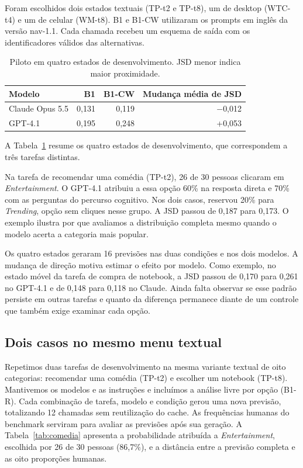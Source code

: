 \documentclass[12pt]{article}
\begin{document}
Foram escolhidos dois estados textuais (TP-t2 e TP-t8), um de desktop (WTC-t4) e um de celular (WM-t8). B1 e B1-CW utilizaram os prompts em inglês da versão nav-1.1. Cada chamada recebeu um esquema de saída com os identificadores válidos das alternativas.

\begin{table}[!htb]\centering\small\caption{Piloto em quatro estados de desenvolvimento. JSD menor indica maior proximidade.}\label{tab:piloto}\begin{tabularx}{\linewidth}{@{}Xrrr@{}}\toprule
Modelo & B1 & B1-CW & Mudança média de JSD \\ \midrule
Claude Opus 5.5 & 0,131 & 0,119 & $-$0,012 \\
GPT-4.1 & 0,195 & 0,248 & +0,053 \\\bottomrule\end{tabularx}\end{table}

A Tabela~\ref{tab:piloto} resume os quatro estados de desenvolvimento, que correspondem a três tarefas distintas.

Na tarefa de recomendar uma comédia (TP-t2), 26 de 30 pessoas clicaram em \emph{Entertainment}. O GPT-4.1 atribuiu a essa opção 60\% na resposta direta e 70\% com as perguntas do percurso cognitivo. Nos dois casos, reservou 20\% para \emph{Trending}, opção sem cliques nesse grupo. A JSD passou de 0,187 para 0,173. O exemplo ilustra por que avaliamos a distribuição completa mesmo quando o modelo acerta a categoria mais popular.\par

Os quatro estados geraram 16 previsões nas duas condições e nos dois modelos. A mudança de direção motiva estimar o efeito por modelo. Como exemplo, no estado móvel da tarefa de compra de notebook, a JSD passou de 0,170 para 0,261 no GPT-4.1 e de 0,148 para 0,118 no Claude. Ainda falta observar se esse padrão persiste em outras tarefas e quanto da diferença permanece diante de um controle que também exige examinar cada opção.

\subsection{Dois casos no mesmo menu textual}
Repetimos duas tarefas de desenvolvimento na mesma variante textual de oito categorias: recomendar uma comédia (TP-t2) e escolher um notebook (TP-t8). Mantivemos os modelos e as instruções e incluímos a análise livre por opção (B1-R). Cada combinação de tarefa, modelo e condição gerou uma nova previsão, totalizando 12 chamadas sem reutilização do cache. As frequências humanas do benchmark serviram para avaliar as previsões após sua geração. A Tabela~\ref{tab:comedia} apresenta a probabilidade atribuída a \emph{Entertainment}, escolhida por 26 de 30 pessoas (86,7\%), e a distância entre a previsão completa e as oito proporções humanas.
\end{document}
